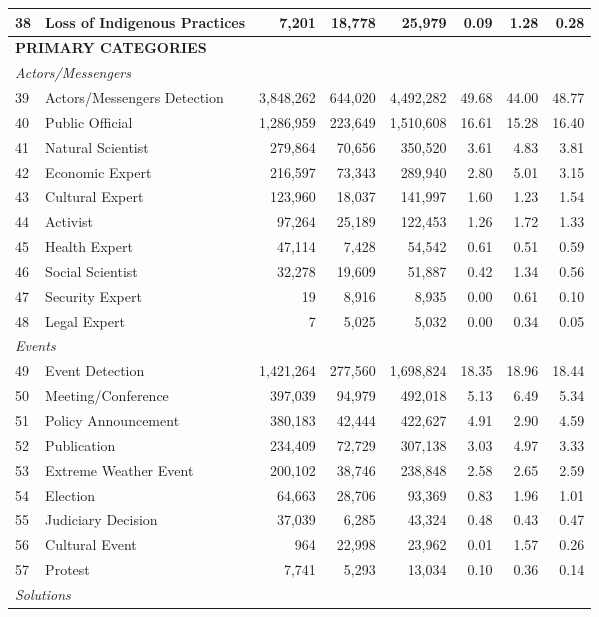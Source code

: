 \documentclass[12pt]{article}
\begin{document}
{\begin{longtable}{p{0.5cm}p{5.5cm}rrrrrr}
38 & Loss of Indigenous Practices & 7,201 & 18,778 & 25,979 & 0.09 & 1.28 & 0.28 \\
\midrule
\multicolumn{8}{l}{\cellcolor{gray!10}\textbf{PRIMARY CATEGORIES}} \\
\midrule
\multicolumn{8}{l}{\textit{Actors/Messengers}} \\
39 & Actors/Messengers Detection & 3,848,262 & 644,020 & 4,492,282 & 49.68 & 44.00 & 48.77 \\
40 & Public Official & 1,286,959 & 223,649 & 1,510,608 & 16.61 & 15.28 & 16.40 \\
41 & Natural Scientist & 279,864 & 70,656 & 350,520 & 3.61 & 4.83 & 3.81 \\
42 & Economic Expert & 216,597 & 73,343 & 289,940 & 2.80 & 5.01 & 3.15 \\
43 & Cultural Expert & 123,960 & 18,037 & 141,997 & 1.60 & 1.23 & 1.54 \\
44 & Activist & 97,264 & 25,189 & 122,453 & 1.26 & 1.72 & 1.33 \\
45 & Health Expert & 47,114 & 7,428 & 54,542 & 0.61 & 0.51 & 0.59 \\
46 & Social Scientist & 32,278 & 19,609 & 51,887 & 0.42 & 1.34 & 0.56 \\
47 & Security Expert & 19 & 8,916 & 8,935 & 0.00 & 0.61 & 0.10 \\
48 & Legal Expert & 7 & 5,025 & 5,032 & 0.00 & 0.34 & 0.05 \\
\midrule
\multicolumn{8}{l}{\textit{Events}} \\
49 & Event Detection & 1,421,264 & 277,560 & 1,698,824 & 18.35 & 18.96 & 18.44 \\
50 & Meeting/Conference & 397,039 & 94,979 & 492,018 & 5.13 & 6.49 & 5.34 \\
51 & Policy Announcement & 380,183 & 42,444 & 422,627 & 4.91 & 2.90 & 4.59 \\
52 & Publication & 234,409 & 72,729 & 307,138 & 3.03 & 4.97 & 3.33 \\
53 & Extreme Weather Event & 200,102 & 38,746 & 238,848 & 2.58 & 2.65 & 2.59 \\
54 & Election & 64,663 & 28,706 & 93,369 & 0.83 & 1.96 & 1.01 \\
55 & Judiciary Decision & 37,039 & 6,285 & 43,324 & 0.48 & 0.43 & 0.47 \\
56 & Cultural Event & 964 & 22,998 & 23,962 & 0.01 & 1.57 & 0.26 \\
57 & Protest & 7,741 & 5,293 & 13,034 & 0.10 & 0.36 & 0.14 \\
\midrule
\multicolumn{8}{l}{\textit{Solutions}} \\

\end{longtable}}
\end{document}
